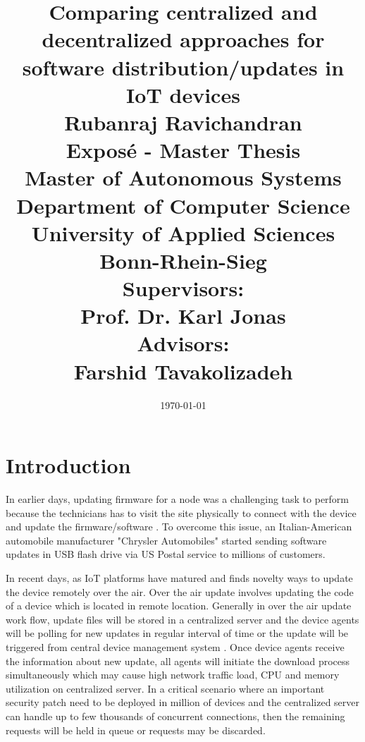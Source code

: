 \documentclass[12pt]{article}
\begin{document}
\title{\Large Comparing centralized and decentralized approaches for software distribution/updates in IoT devices\\
[6mm]
\Large Rubanraj Ravichandran\\
[12mm]
\Large Expos{\'e} - Master Thesis\\
\small Master of Autonomous Systems\\
[12mm]
\Large Department of Computer Science\\
University of Applied Sciences Bonn-Rhein-Sieg\\
[12mm]
\Large Supervisors:\\
Prof. Dr. Karl Jonas\\
\Large Advisors:\\
Farshid Tavakolizadeh
}
\date{\today}
\maketitle
\newpage
\section{Introduction}

In earlier days, updating firmware for a node was a challenging task to perform because the technicians has to visit the site physically to connect with the device and update the firmware/software \cite{ganesan,moorits}. To overcome this issue, an Italian-American automobile manufacturer "Chrysler Automobiles" started sending software updates in USB flash drive via US Postal service to millions of customers\cite{misc01}. 


In recent days, as IoT platforms have matured and finds novelty ways to update the device remotely over the air.  Over the air update involves updating the code of a device which is located in remote location. 
Generally in over the air update work flow,  update files will be stored in a centralized server and the device agents will be polling for new updates in regular interval of time or the update will be triggered from central device management system \cite{nilsson}. Once device agents receive the information about new update, all agents will initiate the download process simultaneously which may cause high network traffic load, CPU and memory utilization on centralized server. In a critical scenario where an important security patch need to be deployed in million of devices and the centralized server can handle up to few thousands of concurrent connections, then the remaining requests will be held in queue or requests may be discarded. 
\end{document}
